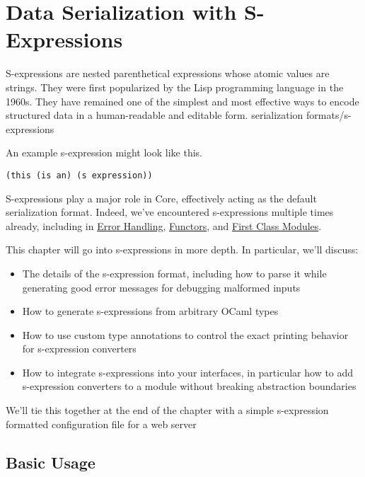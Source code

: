 \hypertarget{data-serialization-with-s-expressions}{%
\section{Data Serialization with
S-Expressions}\label{data-serialization-with-s-expressions}}

S-expressions are nested parenthetical expressions whose atomic values
are strings. They were first popularized by the Lisp programming
language in the 1960s. They have remained one of the simplest and most
effective ways to encode structured data in a human-readable and
editable form. \protect\hypertarget{SERFORMsexp}{}{serialization
formats/s-expressions}

An example s-expression might look like this.

\begin{lstlisting}
(this (is an) (s expression))
\end{lstlisting}

S-expressions play a major role in Core, effectively acting as the
default serialization format. Indeed, we've encountered s-expressions
multiple times already, including in
\href{error-handling.html\#error-handling}{Error Handling},
\href{functors.html\#functors}{Functors}, and
\href{first-class-modules.html\#first-class-modules}{First Class
Modules}.

This chapter will go into s-expressions in more depth. In particular,
we'll discuss:

\begin{itemize}
\item
  The details of the s-expression format, including how to parse it
  while generating good error messages for debugging malformed inputs
\item
  How to generate s-expressions from arbitrary OCaml types
\item
  How to use custom type annotations to control the exact printing
  behavior for s-expression converters
\item
  How to integrate s-expressions into your interfaces, in particular how
  to add s-expression converters to a module without breaking
  abstraction boundaries
\end{itemize}

We'll tie this together at the end of the chapter with a simple
s-expression formatted configuration file for a web server

\hypertarget{basic-usage}{%
\subsection{Basic Usage}\label{basic-usage}}

